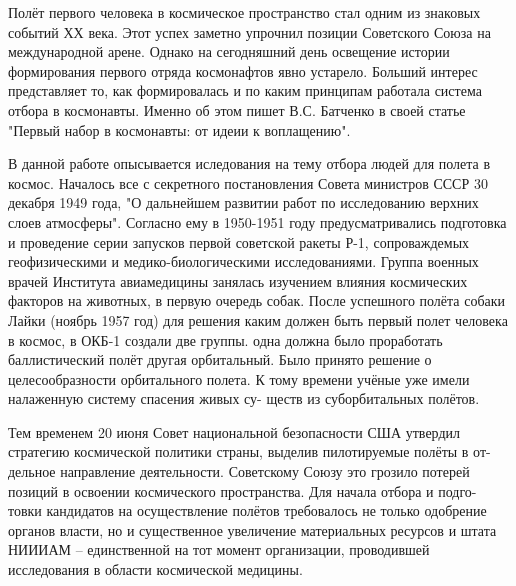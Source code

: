
\title{}
\author{max-wn}
\date{April 12, 1961}




\large{Полёт первого человека в космическое пространство стал одним из знаковых событий ХХ века. Этот успех заметно упрочнил позиции Советского Союза на международной арене. Однако на сегодняшний день освещение истории формирования первого отряда космонафтов явно устарело. Больший интерес представляет то, как формировалась и по каким принципам работала система отбора в космонавты. Именно об этом пишет В.С. Батченко в своей статье "Первый набор в космонавты: от идеии к воплащению".}


В данной работе опысывается иследования на тему отбора людей для полета в космос. Началось все с секретного постановления Совета министров СССР 30 декабря 1949 года, "О дальнейшем развитии работ по исследованию верхних слоев атмосферы". Согласно ему в 1950-1951 году предусматривались подготовка и проведение серии запусков первой советской ракеты Р-1, сопроваждемых геофизическими и медико-биологическими исследованиями. Группа военных врачей Института авиамедицины занялась изучением влияния космических факторов на животных, в первую очередь собак. После успешного полёта собаки Лайки (ноябрь 1957 год) для решения каким должен быть первый полет человека в космос, в ОКБ-1 создали две группы. одна должна было проработать баллистический полёт другая орбитальный. Было принято решение о целесообразности орбитального полета. К тому времени учёные уже имели налаженную систему спасения живых су-
ществ из суборбитальных полётов.

Тем временем 20 июня Совет национальной безопасности США утвердил
стратегию космической политики страны, выделив пилотируемые полёты в от-
дельное направление деятельности. Советскому Союзу это грозило потерей
позиций в освоении космического пространства. Для начала отбора и подго-
товки кандидатов на осуществление полётов требовалось не только одобрение
органов власти, но и существенное увеличение материальных ресурсов и штата
НИИИАМ – единственной на тот момент организации, проводившей исследования в области космической медицины.

